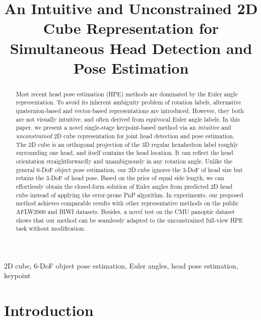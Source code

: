 \documentclass{article}
\title{An Intuitive and Unconstrained 2D Cube Representation for Simultaneous Head Detection and Pose Estimation}
\begin{document}
\maketitle

\begin{abstract}
Most recent head pose estimation (HPE) methods are dominated by the Euler angle representation. To avoid its inherent ambiguity problem of rotation labels, alternative quaternion-based and vector-based representations are introduced. However, they both are not visually intuitive, and often derived from equivocal Euler angle labels. In this paper, we present a novel single-stage keypoint-based method via an {\it intuitive} and {\it unconstrained} 2D cube representation for joint head detection and pose estimation. The 2D cube is an orthogonal projection of the 3D regular hexahedron label roughly surrounding one head, and itself contains the head location. It can reflect the head orientation straightforwardly and unambiguously in any rotation angle. Unlike the general 6-DoF object pose estimation, our 2D cube ignores the 3-DoF of head size but retains the 3-DoF of head pose. Based on the prior of equal side length, we can effortlessly obtain the closed-form solution of Euler angles from predicted 2D head cube instead of applying the error-prone PnP algorithm. In experiments, our proposed method achieves comparable results with other representative methods on the public AFLW2000 and BIWI datasets. Besides, a novel test on the CMU panoptic dataset shows that our method can be seamlessly adapted to the unconstrained full-view HPE task without modification.
\end{abstract} 
\begin{keywords}
2D cube, 6-DoF object pose estimation, Euler angles, head pose estimation, keypoint
\end{keywords}


\section{Introduction}
\end{document}
